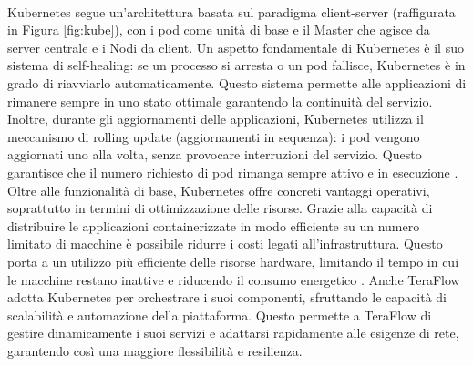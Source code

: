 \\Kubernetes segue un'architettura basata sul paradigma client-server (raffigurata in Figura \ref{fig:kube}), con i pod come unità di base e il Master che agisce da server centrale e i Nodi da client. 
Un aspetto fondamentale di Kubernetes è il suo sistema di self-healing: se un processo si arresta o un pod fallisce, Kubernetes è in grado di riavviarlo automaticamente. 
Questo sistema permette alle applicazioni di rimanere sempre in uno stato ottimale garantendo la continuità del servizio.
Inoltre, durante gli aggiornamenti delle applicazioni, Kubernetes utilizza il meccanismo di rolling update (aggiornamenti in sequenza): 
i pod vengono aggiornati uno alla volta, senza provocare interruzioni del servizio. Questo garantisce che il numero richiesto di pod rimanga sempre attivo e in esecuzione \cite{kubeart}.
Oltre alle funzionalità di base, Kubernetes offre concreti vantaggi operativi, soprattutto in termini di ottimizzazione delle risorse. 
Grazie alla capacità di distribuire le applicazioni containerizzate in modo efficiente su un numero limitato di macchine è possibile ridurre i costi legati all'infrastruttura. 
Questo porta a un utilizzo più efficiente delle risorse hardware, limitando il tempo in cui le macchine restano inattive e riducendo il consumo energetico \cite{bookub}.
Anche TeraFlow adotta Kubernetes per orchestrare i suoi componenti, sfruttando le capacità di scalabilità e automazione della piattaforma. 
Questo permette a TeraFlow di gestire dinamicamente i suoi servizi e adattarsi rapidamente alle esigenze di rete, garantendo così una maggiore flessibilità e resilienza.

